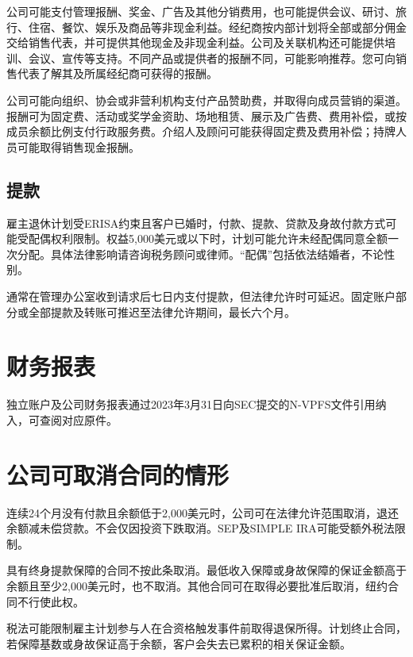 \documentclass[UTF8,fontset=none,11pt,a4paper]{ctexart}
\begin{document}
公司可能支付管理报酬、奖金、广告及其他分销费用，也可能提供会议、研讨、旅行、住宿、餐饮、娱乐及商品等非现金利益。经纪商按内部计划将全部或部分佣金交给销售代表，并可提供其他现金及非现金利益。公司及关联机构还可能提供培训、会议、宣传等支持。不同产品或提供者的报酬不同，可能影响推荐。您可向销售代表了解其及所属经纪商可获得的报酬。


公司可能向组织、协会或非营利机构支付产品赞助费，并取得向成员营销的渠道。报酬可为固定费、活动或奖学金资助、场地租赁、展示及广告费、费用补偿，或按成员余额比例支付行政服务费。介绍人及顾问可能获得固定费及费用补偿；持牌人员可能取得销售现金报酬。


\subsection*{提款}
雇主退休计划受ERISA约束且客户已婚时，付款、提款、贷款及身故付款方式可能受配偶权利限制。权益5,000美元或以下时，计划可能允许未经配偶同意全额一次分配。具体法律影响请咨询税务顾问或律师。“配偶”包括依法结婚者，不论性别。


通常在管理办公室收到请求后七日内支付提款，但法律允许时可延迟。固定账户部分或全部提款及转账可推迟至法律允许期间，最长六个月。


\section*{财务报表}
独立账户及公司财务报表通过2023年3月31日向SEC提交的N-VPFS文件引用纳入，可查阅对应原件。


\section*{公司可取消合同的情形}
连续24个月没有付款且余额低于2,000美元时，公司可在法律允许范围取消，退还余额减未偿贷款。不会仅因投资下跌取消。SEP及SIMPLE IRA可能受额外税法限制。


具有终身提款保障的合同不按此条取消。最低收入保障或身故保障的保证金额高于余额且至少2,000美元时，也不取消。其他合同可在取得必要批准后取消，纽约合同不行使此权。


税法可能限制雇主计划参与人在合资格触发事件前取得退保所得。计划终止合同，若保障基数或身故保证高于余额，客户会失去已累积的相关保证金额。
\end{document}
